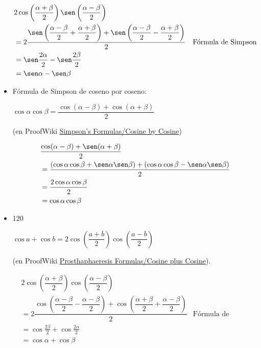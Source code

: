 \documentclass[11pt]{article}
\begin{document}
\begin{itemize}
\begin{demostracion}
\begin{align*}
  &  2 \cos\left(\dfrac{\alpha+\beta}{2}\right)
       \sen\left(\dfrac{\alpha-\beta}{2}\right) \\
  &= 2 \dfrac{\sen\left(\dfrac{\alpha-\beta}{2} + \dfrac{\alpha+\beta}{2}\right) +
              \sen\left(\dfrac{\alpha-\beta}{2} - \dfrac{\alpha+\beta}{2}\right)}
             {2}
       & \mbox{Fórmula de Simpson} \\
  &= \sen \frac{2\alpha}{2} - \sen \frac{2\beta}{2} \\
  &= \sen \alpha - \sen \beta \\
\end{align*}
\end{demostracion}

\item Fórmula de Simpson de coseno por coseno: \\
\begin{teorema}
\(\cos \alpha \cos \beta = \dfrac{\cos(\alpha-\beta) + \cos(\alpha+\beta)}{2}\)
\end{teorema}
\begin{demostracion}
(en ProofWiki \href{https://proofwiki.org/wiki/Simpson\%27s\_Formulas/Cosine\_by\_Cosine}{Simpson's Formulas/Cosine by Cosine})

\begin{align*}
 &  \dfrac{\cos(\alpha-\beta) + \sen(\alpha+\beta)}{2} \\
 &= \dfrac{(\cos \alpha \cos \beta + \sen \alpha \sen \beta) + (\cos \alpha \cos \beta - \sen \alpha \sen \beta)}{2} \\
 &= \dfrac{2 \cos \alpha \cos \beta}{2} \\
 &= \cos \alpha \cos \beta
\end{align*}
\end{demostracion}

\item 120
\begin{teorema}
\(\cos a  + \cos b  =
  2\cos\left(\dfrac{a+b}{2}\right)\cos\left(\dfrac{a-b}{2}\right)\)
\end{teorema}
\begin{demostracion}
(en ProofWiki \href{https://proofwiki.org/wiki/Prosthaphaeresis\_Formulas/Cosine\_plus\_Cosine}{Prosthaphaeresis Formulas/Cosine plus Cosine}).

\begin{align*}
  &  2 \cos\left(\dfrac{\alpha+\beta}{2}\right)
       \cos\left(\dfrac{\alpha-\beta}{2}\right) \\
  &= 2 \dfrac{\cos\left(\dfrac{\alpha-\beta}{2} - \dfrac{\alpha-\beta}{2}\right) +
              \cos\left(\dfrac{\alpha+\beta}{2} + \dfrac{\alpha-\beta}{2}\right)}
             {2}
       & \mbox{Fórmula de Simpson} \\
  &= \cos \frac{2\beta}{2} + \cos \frac{2\alpha}{2} \\
  &= \cos \alpha + \cos \beta \\
\end{align*}
\end{demostracion}


\end{itemize}
\end{document}
